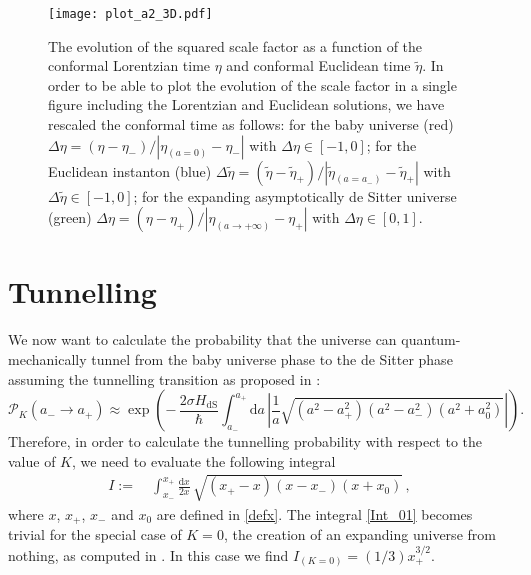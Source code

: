 \documentclass[aps,nofootinbib,prd,superscriptaddress,eqsecnum,showpacs,showkeys,preprintnumbers,altaffilletter]{revtex4}
\def\D{\mathrm{d}}
\def\be{\begin{equation}}
\def\ee{\end{equation}}
\newcommand{\HdS}{H_\mathrm{dS}}
\begin{document}
\begin{figure}
  \centering
\texttt{[image: plot\_a2\_3D.pdf]}
\caption{\label{a2_evolution}The evolution of the squared scale factor as a function of the conformal Lorentzian time $\eta$ and conformal Euclidean time $\tilde\eta$.
In order to be able to plot the evolution of the scale factor in a single figure including the Lorentzian and Euclidean solutions, we have rescaled the conformal time as follows: for the baby universe (red) $\Delta\eta = (\eta - \eta_-)/|\eta_{(a=0)} - \eta_-|$ with $\Delta\eta\in[-1,0]$; for the Euclidean instanton (blue) $\Delta\tilde\eta = (\tilde\eta - \tilde\eta_+)/|\tilde\eta_{(a=a_-)} - \tilde\eta_+|$ with $\Delta\tilde\eta\in[-1,0]$; for the expanding asymptotically de Sitter universe (green) $\Delta\eta = (\eta - \eta_+)/|\eta_{(a\rightarrow+\infty)} - \eta_+|$ with $\Delta\eta\in[0,1]$.
}
\end{figure}

%
%

\section{Tunnelling}

We now want to calculate the probability that the universe can quantum-mechanically tunnel from the baby universe phase to the de Sitter phase assuming the tunnelling transition as proposed in \cite{Vilenkin:1984wp,Vilenkin}: 
\be \label{probk}
	\mathcal{P}_K(a_-\rightarrow a_+) \approx \exp\left(-\,\frac{2\sigma \HdS}{\hbar} \int_{a_-}^{a_+}\D a\,\left|\frac{1}{a} \sqrt{(a^2 - a_+^2)(a^2 - a_-^2)(a^2 + a_0^2)}\right|\right).
\ee
Therefore, in order to calculate the tunnelling probability with respect to the value of $K$, we need to evaluate the following integral
\begin{align}
	 \label{Int_01}
	I :=&~  \int_{x_-}^{x_+} \frac{\D x}{2x}\,\sqrt{(x_+ - x) (x-x_-) (x+x_0) } 
	\,,
\end{align}
where $x$, $x_+$, $x_-$ and $x_0$ are defined in \eqref{defx}.
The integral \eqref{Int_01} becomes trivial for the special case of $K=0$, the creation of an expanding universe from nothing, as computed in \cite{Vilenkin:1984wp}. In this case we find $I_{(K=0)} = (1/3)x_+^{3/2}$.
\end{document}
